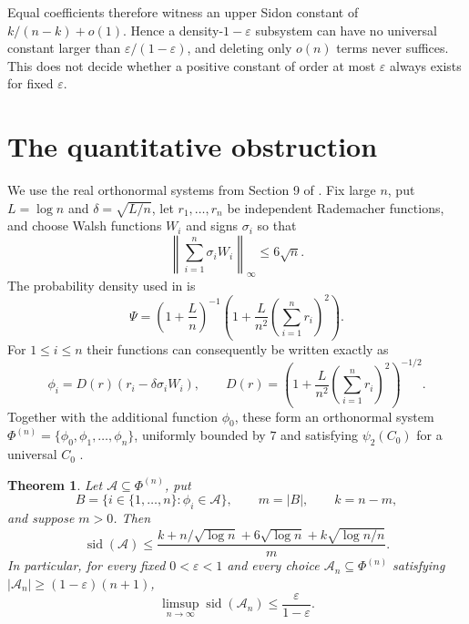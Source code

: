 \documentclass[11pt]{article}
\newtheorem{theorem}{Theorem}
\newcommand{\sid}{\operatorname{sid}}
\begin{document}
Equal coefficients therefore witness an upper Sidon constant of
$k/(n-k)+o(1)$.  Hence a density-$1-\varepsilon$ subsystem can have no
universal constant larger than $\varepsilon/(1-\varepsilon)$, and deleting
only $o(n)$ terms never suffices.  This does not decide whether a positive
constant of order at most $\varepsilon$ always exists for fixed
$\varepsilon$.

\section{The quantitative obstruction}

We use the real orthonormal systems from Section 9 of \cite{BL}.  Fix large
$n$, put $L=\log n$ and $\delta=\sqrt{L/n}$, let $r_1,\ldots,r_n$ be
independent Rademacher functions, and choose Walsh functions $W_i$ and signs
$\sigma_i$ so that
\begin{equation}\label{eq:RS}
 \left\|\sum_{i=1}^n\sigma_iW_i\right\|_\infty\leq6\sqrt n.
\end{equation}
The probability density used in \cite{BL} is
\[
 \Psi=\left(1+\frac{L}{n}\right)^{-1}
 \left(1+\frac{L}{n^2}\left(\sum_{i=1}^nr_i\right)^2\right).
\]
For $1\leq i\leq n$ their functions can consequently be written exactly as
\begin{equation}\label{eq:phi}
 \phi_i=D(r)(r_i-\delta\sigma_iW_i),\qquad
 D(r)=\left(1+\frac{L}{n^2}\left(\sum_{i=1}^nr_i\right)^2\right)^{-1/2}.
\end{equation}
Together with the additional function $\phi_0$, these form an orthonormal
system $\Phi^{(n)}=\{\phi_0,\phi_1,\ldots,\phi_n\}$, uniformly bounded by
$7$ and satisfying $\psi_2(C_0)$ for a universal $C_0$ \cite{BL}.

\begin{theorem}\label{thm:quant}
Let $\mathcal A\subseteq\Phi^{(n)}$, put
\[
 B=\{i\in\{1,\ldots,n\}:\phi_i\in\mathcal A\},\qquad
 m=|B|,\qquad k=n-m,
\]
and suppose $m>0$.  Then
\begin{equation}\label{eq:bound}
 \sid(\mathcal A)
 \leq
 \frac{k+n/\sqrt{\log n}+6\sqrt{\log n}
       +k\sqrt{\log n/n}}{m}.
\end{equation}
In particular, for every fixed $0<\varepsilon<1$ and every choice
$\mathcal A_n\subseteq\Phi^{(n)}$ satisfying
$|\mathcal A_n|\geq(1-\varepsilon)(n+1)$,
\begin{equation}\label{eq:limsup}
 \limsup_{n\to\infty}\sid(\mathcal A_n)
 \leq\frac{\varepsilon}{1-\varepsilon}.
\end{equation}
\end{theorem}
\end{document}
